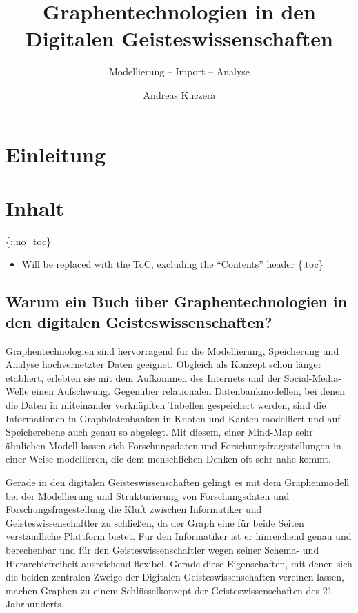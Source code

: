 \documentclass[ngerman,]{scrreprt}
\title{Graphentechnologien in den Digitalen Geisteswissenschaften}
\subtitle{Modellierung -- Import -- Analyse}
\author{Andreas Kuczera}
\date{}
\providecommand{\tightlist}{%
  \setlength{\itemsep}{0pt}\setlength{\parskip}{0pt}}
\begin{document}
\maketitle

{
\hypersetup{linkcolor=}
\setcounter{tocdepth}{2}
\tableofcontents
}
\hypertarget{einleitung}{%
\chapter{Einleitung}\label{einleitung}}

\hypertarget{inhalt}{%
\chapter{Inhalt}\label{inhalt}}

\{:.no\_toc\}

\begin{itemize}
\tightlist
\item
  Will be replaced with the ToC, excluding the ``Contents'' header \{:toc\}
\end{itemize}

\hypertarget{warum-ein-buch-uxfcber-graphentechnologien-in-den-digitalen-geisteswissenschaften}{%
\section{Warum ein Buch über Graphentechnologien in den digitalen Geisteswissenschaften?}\label{warum-ein-buch-uxfcber-graphentechnologien-in-den-digitalen-geisteswissenschaften}}

Graphentechnologien sind hervorragend für die Modellierung, Speicherung und Analyse hochvernetzter Daten geeignet. Obgleich als Konzept schon länger etabliert, erlebten sie mit dem Aufkommen des Internets und der Social-Media-Welle einen Aufschwung. Gegenüber relationalen Datenbankmodellen, bei denen die Daten in miteinander verknüpften Tabellen gespeichert werden, sind die Informationen in Graphdatenbanken in Knoten und Kanten modelliert und auf Speicherebene auch genau so abgelegt. Mit diesem, einer Mind-Map sehr ähnlichen Modell lassen sich Forschungsdaten und Forschungsfragestellungen in einer Weise modellieren, die dem menschlichen Denken oft sehr nahe kommt.

Gerade in den digitalen Geisteswissenschaften gelingt es mit dem Graphenmodell bei der Modellierung und Strukturierung von Forschungsdaten und Forschungsfragestellung die Kluft zwischen Informatiker und Geisteswissenschaftler zu schließen, da der Graph eine für beide Seiten verständliche Plattform bietet. Für den Informatiker ist er hinreichend genau und berechenbar und für den Geisteswissenschaftler wegen seiner Schema- und Hierarchiefreiheit ausreichend flexibel. Gerade diese Eigenschaften, mit denen sich die beiden zentralen Zweige der Digitalen Geisteswissenschaften vereinen lassen, machen Graphen zu einem Schlüsselkonzept der Geisteswissenschaften des 21 Jahrhunderts.
\end{document}
